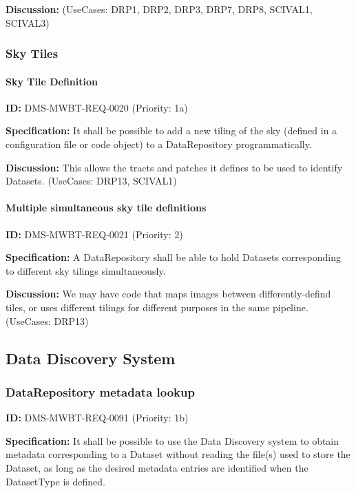 \documentclass[SE,toc,lsstdraft]{lsstdoc}
\begin{document}
\textbf{Discussion:}
(UseCases: DRP1, DRP2, DRP3, DRP7, DRP8, SCIVAL1, SCIVAL3)

\subsubsection{Sky Tiles}

\paragraph{Sky Tile Definition}\hfill  %

\label{DMS-MWBT-REQ-0020}
\textbf{ID:} DMS-MWBT-REQ-0020 (Priority: 1a)

\textbf{Specification:}
It shall be possible to add a new tiling of the sky (defined in a configuration file or code object) to a DataRepository programmatically.

\textbf{Discussion:}
This allows the tracts and patches it defines to be used to identify Datasets. (UseCases: DRP13, SCIVAL1)

\paragraph{Multiple simultaneous sky tile definitions}\hfill  %

\label{DMS-MWBT-REQ-0021}
\textbf{ID:} DMS-MWBT-REQ-0021 (Priority: 2)

\textbf{Specification:}
A DataRepository shall be able to hold Datasets corresponding to different sky tilings simultaneously.

\textbf{Discussion:}
We may have code that maps images between differently-defind tiles, or uses different tilings for different purposes in the same pipeline. (UseCases: DRP13)

\subsection{Data Discovery System}

\subsubsection{DataRepository metadata lookup}

\label{DMS-MWBT-REQ-0091}
\textbf{ID:} DMS-MWBT-REQ-0091 (Priority: 1b)

\textbf{Specification:}
It shall be possible to use the Data Discovery system to obtain metadata corresponding to a Dataset without reading the file(s) used to store the Dataset, as long as the desired metadata entries are identified when the DatasetType is defined.
\end{document}
